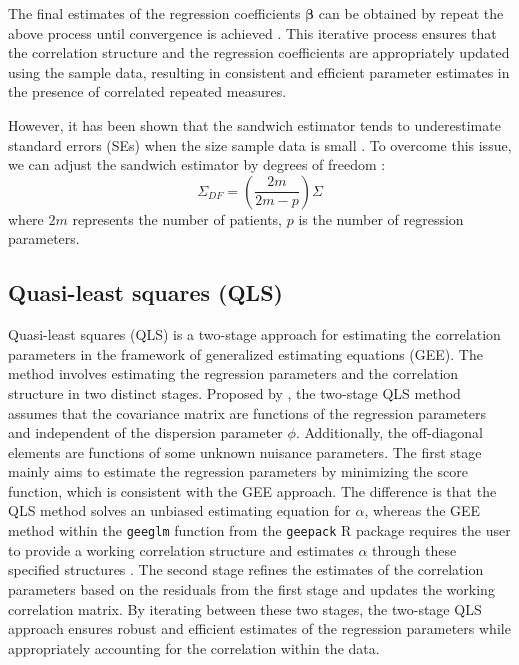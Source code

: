 \documentclass[
]{aft}
\begin{document}
The final estimates of the regression coefficients
\(\boldsymbol{\beta}\) can be obtained by repeat the above process until
convergence is achieved \citep{Liang1986}. This iterative process
ensures that the correlation structure and the regression coefficients
are appropriately updated using the sample data, resulting in consistent
and efficient parameter estimates in the presence of correlated repeated
measures.

However, it has been shown that the sandwich estimator tends to
underestimate standard errors (SEs) when the size sample data is small
\citep{Mitani2019}. To overcome this issue, we can adjust the sandwich
estimator by degrees of freedom \citep{dfcorrect}: \begin{equation}
\Sigma_{DF} = (\frac{2m}{2m-p})\Sigma \label{eq:geeSigmaDF}
\end{equation} where \(2m\) represents the number of patients, \(p\) is
the number of regression parameters.

\subsection{Quasi-least squares (QLS)}\label{quasi-least-squares-qls}

Quasi-least squares (QLS) is a two-stage approach for estimating the
correlation parameters in the framework of generalized estimating
equations (GEE). The method involves estimating the regression
parameters and the correlation structure in two distinct stages.
Proposed by \citet{qls}, the two-stage QLS method assumes that the
covariance matrix are functions of the regression parameters and
independent of the dispersion parameter \(\phi\). Additionally, the
off-diagonal elements are functions of some unknown nuisance parameters.
The first stage mainly aims to estimate the regression parameters by
minimizing the score function, which is consistent with the GEE
approach. The difference is that the QLS method solves an unbiased
estimating equation for \(\alpha\), whereas the GEE method within the
\texttt{geeglm} function from the \texttt{geepack} R package requires
the user to provide a working correlation structure and estimates
\(\alpha\) through these specified structures \citep{Hojsgaard2006}. The
second stage refines the estimates of the correlation parameters based
on the residuals from the first stage and updates the working
correlation matrix. By iterating between these two stages, the two-stage
QLS approach ensures robust and efficient estimates of the regression
parameters while appropriately accounting for the correlation within the
data.
\end{document}
